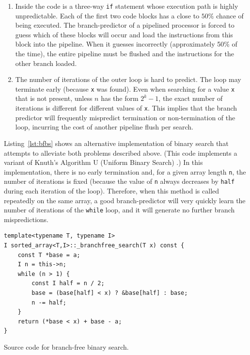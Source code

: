 \documentclass{patmorin}
\newcommand{\lstlabel}[1]{\label{lst:#1}}
\newcommand{\lstref}[1]{Listing~\ref{lst:#1}}
\newcommand{\Lstref}[1]{\lstref{#1}}
\begin{document}
\begin{enumerate}

\item Inside the code is a three-way \texttt{if} statement whose
execution path is highly unpredictable. Each of the first two code blocks
has a close to $50\%$ chance of being executed.  The branch-predictor of
a pipelined processor is forced to guess which of these blocks will
occur and load the instructions from this block into the pipeline.
When it guesses incorrectly (approximately 50\% of the time), the entire
pipeline must be flushed and the instructions for the other branch loaded.

\item The number of iterations of the outer loop is hard to predict. The
loop may terminate early (because \texttt{x} was found). Even
when searching for a value \texttt{x} that is not present, unless
$n$ has the form $2^k-1$, the exact number of iterations is different for
different values of \texttt{x}.  This implies that the branch
predictor will frequently mispredict termination or non-termination of
the loop, incurring the cost of another pipeline flush per search.

\end{enumerate}

\Lstref{bfbs} shows an alternative implementation of binary search
that attempts to alleviate both problems described above. (This
code implements a variant of Knuth's Algorithm U (Uniform Binary Search)
\cite[Section~6.2.1]{knuth:art}.)  In this implementation, there is no
early termination and, for a given array length \texttt{n}, the
number of iterations is fixed (because the value of \texttt{n}
always decreases by \texttt{half} during each iteration of
the loop).  Therefore, when this method is called repeatedly on the
same array, a good branch-predictor will very quickly learn the number
of iterations of the \texttt{while} loop, and it will generate
no further branch mispredictions.

\begin{listing}
\begin{verbatim}
template<typename T, typename I>
I sorted_array<T,I>::_branchfree_search(T x) const {
    const T *base = a;
    I n = this->n;
    while (n > 1) {
        const I half = n / 2;
        base = (base[half] < x) ? &base[half] : base;
        n -= half;
    }
    return (*base < x) + base - a;
}
\end{verbatim}
\caption{Source code for branch-free binary search.}
\lstlabel{bfbs}
\end{listing}
\end{document}
